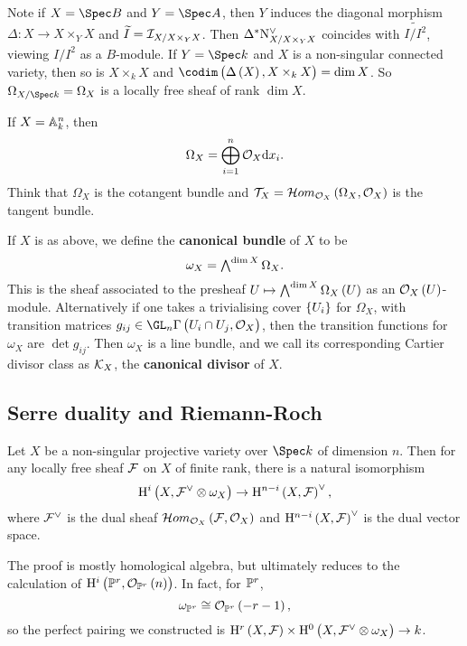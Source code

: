 Note if $ X = \Spec B $ and $ Y = \Spec A $, then $ Y $ induces the diagonal morphism $ \Delta : X \to X \times_Y X $ and $ \widetilde{I} = \III_{X / X \times_Y X} $. Then $ \Delta^*\N_{X / X \times_Y X}^\vee $ coincides with $ \widetilde{I / I^2} $, viewing $ I / I^2 $ as a $ B $-module. If $ Y = \Spec k $ and $ X $ is a non-singular connected variety, then so is $ X \times_k X $ and $ \codim\br{\Delta\br{X}, X \times_k X} = \dim X $. So $ \Omega_{X / \Spec k} = \Omega_X $ is a locally free sheaf of rank $ \dim X $.

\begin{example*}
If $ X = \AA_k^n $, then
$$ \Omega_X = \bigoplus_{i = 1}^n \OOO_X\d x_i. $$
Think that $ \Omega_X $ is the cotangent bundle and $ \TTT_X = \HOM_{\OOO_X}\br{\Omega_X, \OOO_X} $ is the tangent bundle.
\end{example*}

\begin{definition*}
If $ X $ is as above, we define the \textbf{canonical bundle} of $ X $ to be
$$ \omega_X = \ext^{\dim X}\Omega_X. $$
This is the sheaf associated to the presheaf $ U \mapsto \ext^{\dim X}\Omega_X\br{U} $ as an $ \OOO_X\br{U} $-module. Alternatively if one takes a trivialising cover $ \cbr{U_i} $ for $ \Omega_X $, with transition matrices $ g_{ij} \in \GL_n \Gamma\br{U_i \cap U_j, \OOO_X} $, then the transition functions for $ \omega_X $ are $ \det g_{ij} $. Then $ \omega_X $ is a line bundle, and we call its corresponding Cartier divisor class as $ \KKK_X $, the \textbf{canonical divisor} of $ X $.
\end{definition*}

\subsection{Serre duality and Riemann-Roch}

\begin{theorem}
Let $ X $ be a non-singular projective variety over $ \Spec k $ of dimension $ n $. Then for any locally free sheaf $ \FFF $ on $ X $ of finite rank, there is a natural isomorphism
$$ \H^i\br{X, \FFF^\vee \otimes \omega_X} \to \H^{n - i}\br{X, \FFF}^\vee, $$
where $ \FFF^\vee $ is the dual sheaf $ \HOM_{\OOO_X}\br{\FFF, \OOO_X} $ and $ \H^{n - i}\br{X, \FFF}^\vee $ is the dual vector space.
\end{theorem}

The proof is mostly homological algebra, but ultimately reduces to the calculation of $ \H^i\br{\PP^r, \OOO_{\PP^r}\br{n}} $. In fact, for $ \PP^r $,
$$ \omega_{\PP^r} \cong \OOO_{\PP^r}\br{-r - 1}, $$
so the perfect pairing we constructed is $ \H^r\br{X, \FFF} \times \H^0\br{X, \FFF^\vee \otimes \omega_X} \to k $.

